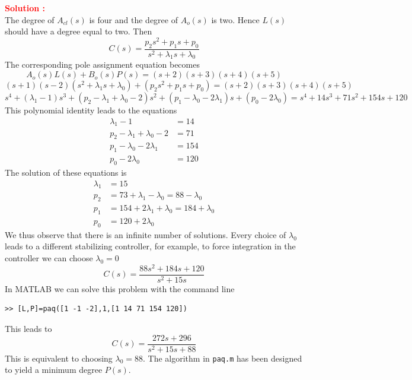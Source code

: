 \documentclass[12pt]{article}
\begin{document}
\textbf{\textcolor{red}{Solution :}} \\ 
The degree of $A_{cl}(s)$ is four and the degree of $A_o(s)$ is two. Hence $L(s)$ should have a degree equal to two. Then
\begin{equation}
C(s) = \frac{p_2s^2 + p_1s + p_0}{s^2 + \lambda_1s + \lambda_0}
\end{equation}
The corresponding pole assignment equation becomes
\begin{equation}
A_o(s)L(s) + B_o(s)P(s) = (s + 2)(s + 3)(s + 4)(s + 5)
\end{equation}
\begin{equation}
(s + 1)(s - 2)(s^2 + \lambda_1s + \lambda_0) + (p_2s^2 + p_1s + p_0) = (s + 2)(s + 3)(s + 4)(s + 5)
\end{equation}
\begin{equation}
s^4 + (\lambda_1 - 1)s^3 + (p_2 - \lambda_1 + \lambda_0 - 2)s^2 + (p_1 - \lambda_0 - 2\lambda_1)s + (p_0 - 2\lambda_0) = s^4 + 14s^3 + 71s^2 + 154s + 120
\end{equation}
This polynomial identity leads to the equations
\begin{align}
\lambda_1 - 1 &= 14 \\
p_2 - \lambda_1 + \lambda_0 - 2 &= 71 \\
p_1 - \lambda_0 - 2\lambda_1 &= 154 \\
p_0 - 2\lambda_0 &= 120
\end{align}
The solution of these equations is
\begin{align}
\lambda_1 &= 15 \\
p_2 &= 73 + \lambda_1 - \lambda_0 = 88 - \lambda_0 \\
p_1 &= 154 + 2\lambda_1 + \lambda_0 = 184 + \lambda_0 \\
p_0 &= 120 + 2\lambda_0
\end{align}
We thus observe that there is an infinite number of solutions. Every choice of $\lambda_0$ leads to a different stabilizing controller, for example, to force integration in the controller we can choose $\lambda_0 = 0$
\begin{equation}
C(s) = \frac{88s^2 + 184s + 120}{s^2 + 15s}
\end{equation}
In MATLAB we can solve this problem with the command line
\begin{verbatim}
>> [L,P]=paq([1 -1 -2],1,[1 14 71 154 120])
\end{verbatim}
This leads to
\begin{equation}
C(s) = \frac{272s + 296}{s^2 + 15s + 88}
\end{equation}
This is equivalent to choosing $\lambda_0 = 88$. The algorithm in \texttt{paq.m} has been designed to yield a minimum degree $P(s)$.
\end{document}
